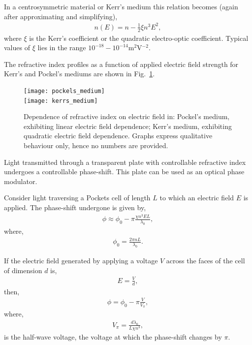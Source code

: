 In a centrosymmetric material or Kerr's medium this relation becomes (again after approximating and simplifying),
\begin{align}
n(E) = n-\frac{1}{2}\xi n^3 E^2,
\end{align}
where $\xi$ is the Kerr's coefficient or the quadratic electro-optic coefficient. Typical values of $\xi$ lies in the range $10^{-18}-10^{-14}$m$^2$V$^{-2}$.

The refractive index profiles as a function of applied electric field strength for Kerr's and Pockel's mediums are shown in Fig.~\ref{fig:EOM_ref_index}.

\begin{figure}[!htbp]
\texttt{[image: pockels\_medium]} \doublecol \\ \fi
\texttt{[image: kerrs\_medium]}
\captionspacefig \caption{Dependence of refractive index on electric field in: Pockel's medium, exhibiting linear electric field dependence; Kerr's medium, exhibiting quadratic electric field dependence. Graphs express qualitative behaviour only, hence no numbers are provided.}\label{fig:EOM_ref_index}
\end{figure}

Light transmitted through a transparent plate with controllable refractive index undergoes a controllable phase-shift. This plate can be used as an optical phase modulator.

Consider light traversing a Pockets cell of length $L$ to which an electric field $E$ is applied. The phase-shift undergone is given by,
\begin{align}
\phi \approx \phi_0 - \pi\frac{\chi n^3 E L}{\lambda_0},
\end{align}
where,
\begin{align}
\phi_0 = \frac{2\pi nL}{\lambda_0}.
\end{align}

If the electric field generated by applying a voltage $V$ across the faces of the cell of dimension $d$ is,
\begin{align}
	E=\frac{V}{d},
\end{align}
then,
\begin{align}
	\phi=\phi_0-\pi \frac{V}{V_\pi},
\end{align}
where,
\begin{align}
	V_\pi=\frac{d\lambda_0}{L\chi n^3},
\end{align}
is the half-wave voltage, the voltage at which the phase-shift changes by $\pi$.

